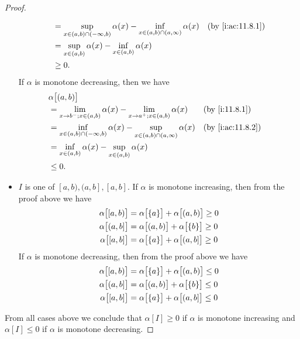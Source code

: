 \begin{proof}
\begin{itemize}
\begin{align*}
             & = \sup_{x \in (a, b) \cap (-\infty, b)} \alpha(x) - \inf_{x \in (a, b) \cap (a, \infty)} \alpha(x) &  & \by{i:ac:11.8.1} \\
             & = \sup_{x \in (a, b)} \alpha(x) - \inf_{x \in (a, b)} \alpha(x)                                                          \\
             & \geq 0.
          \end{align*}
          If \(\alpha\) is monotone decreasing, then we have
          \begin{align*}
             & \alpha\big[(a, b)\big]                                                                                                   \\
             & = \lim_{x \to b^- ; x \in (a, b)} \alpha(x) - \lim_{x \to a^+ ; x \in (a, b)} \alpha(x)            &  & \by{i:11.8.1}    \\
             & = \inf_{x \in (a, b) \cap (-\infty, b)} \alpha(x) - \sup_{x \in (a, b) \cap (a, \infty)} \alpha(x) &  & \by{i:ac:11.8.2} \\
             & = \inf_{x \in (a, b)} \alpha(x) - \sup_{x \in (a, b)} \alpha(x)                                                          \\
             & \leq 0.
          \end{align*}
    \item \(I\) is one of \([a, b), (a, b], [a, b]\).
          If \(\alpha\) is monotone increasing, then from the proof above we have
          \begin{align*}
            \alpha\big[[a, b)\big] & = \alpha\big[\set{a}\big] + \alpha\big[(a, b)\big] \geq 0 \\
            \alpha\big[(a, b]\big] & = \alpha\big[(a, b)\big] + \alpha\big[\set{b}\big] \geq 0 \\
            \alpha\big[[a, b]\big] & = \alpha\big[\set{a}\big] + \alpha\big[(a, b]\big] \geq 0
          \end{align*}
          If \(\alpha\) is monotone decreasing, then from the proof above we have
          \begin{align*}
            \alpha\big[[a, b)\big] & = \alpha\big[\set{a}\big] + \alpha\big[(a, b)\big] \leq 0 \\
            \alpha\big[(a, b]\big] & = \alpha\big[(a, b)\big] + \alpha\big[\set{b}\big] \leq 0 \\
            \alpha\big[[a, b]\big] & = \alpha\big[\set{a}\big] + \alpha\big[(a, b]\big] \leq 0
          \end{align*}
  \end{itemize}
  From all cases above we conclude that \(\alpha[I] \geq 0\) if \(\alpha\) is monotone increasing and \(\alpha[I] \leq 0\) if \(\alpha\) is monotone decreasing.
\end{proof}

